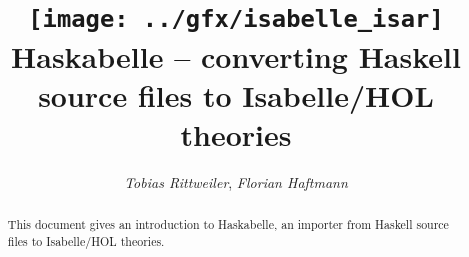 \documentclass[12pt,a4paper,fleqn]{report}
\title{\texttt{[image: ../gfx/isabelle\_isar]}
  \\[4ex] Haskabelle -- converting Haskell source files to Isabelle/HOL theories}
\author{\emph{Tobias Rittweiler}, \emph{Florian Haftmann}}
\begin{document}
\maketitle

\begin{abstract}
  This document gives an introduction to Haskabelle, an importer from
  Haskell source files to Isabelle/HOL theories.
\end{abstract}

\thispagestyle{empty}\clearpage

\clearfirst



\begingroup
 \small\raggedright\frenchspacing

\endgroup
\end{document}
